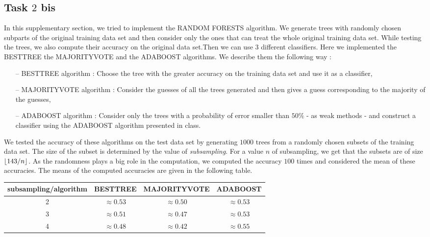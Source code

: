 \documentclass[9pt]{extarticle}
\DeclarePairedDelimiter\floor{\lfloor}{\rfloor}
\begin{document}
\subsection{Task $2$ bis}
	In this supplementary section, we tried to implement the RANDOM FORESTS algorithm. We generate trees with randomly chosen subparts of the original training data set and then consider only the ones that can treat the whole original training data set. While testing the trees, we also compute their accuracy on the original data set.Then we can use $3$ different classifiers. Here we implemented the BESTTREE the MAJORITYVOTE and the ADABOOST algorithms. We describe them the following way :
	\begin{itemize}[topsep=0pt,itemsep=0pt,partopsep=0pt, parsep=0pt]
		\item[--] BESTTREE algorithm : Choose the tree with the greater accuracy on the training data set and use it as a classifier,
		\item[--] MAJORITYVOTE algorithm : Consider the guesses of all the trees generated and then gives a guess corresponding to the majority of the guesses,
		\item[--] ADABOOST algorithm : Consider only the trees with a probability of error smaller than $50\%$  - as weak methods - and construct a classifier using the ADABOOST algorithm presented in class.
	\end{itemize}
	We tested the accuracy of these algorithms on the test data set by generating $1000$ trees from a randomly chosen subsets of the training data set. The size of the subset is determined by the value of \emph{subsampling}. For a value $n$ of subsampling, we get that the subsets are of size $\floor{143/n}$. As the randomness plays a big role in the computation, we computed the accuracy $100$ times and considered the mean of these accuracies. The means of the computed accuracies are given in the following table.
	\begin{center}
		\begin{tabular}{ |c|c|c|c| }
			\hline
			subsampling/algorithm& BESTTREE & MAJORITYVOTE & ADABOOST\\
			\hline
			2 & $\approx 0.53$  & $\approx 0.50$ & $\approx 0.53$ \\
			\hline
			3 & $\approx 0.51 $ & $\approx 0.47$ & $\approx 0.53$ \\
			\hline
			4 & $\approx 0.48$ & $\approx 0.42$ & $\approx 0.55$\\
			\hline
		\end{tabular}
	\end{center}
\end{document}
